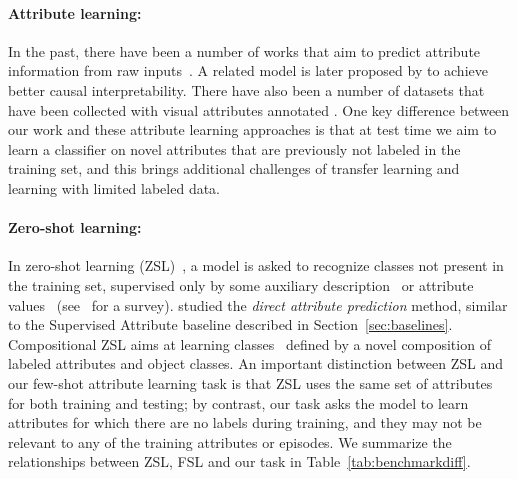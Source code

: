 \paragraph{Attribute learning:}
In the past, there have been a number of works that aim to predict attribute
information from raw
inputs~\citep{ferrari2007attribute,farhadi2009describe,farhadi2010attribute,wang2010discriminative}.
A related model is later proposed by \citet{koh2020concept} to achieve better
causal interpretability.%
There have also been a number of datasets that have been collected with visual
attributes annotated
\citep{cub,zappos,celeba,patterson2016coco,pham2021attribute}. One key
difference between our work and these attribute learning approaches is that at
test time we aim to learn a classifier on novel attributes that are previously
not labeled in the training set, and this brings additional challenges of
transfer learning and learning with limited labeled data.

\savespacebeforesection
\paragraph{Zero-shot learning:} In zero-shot learning
(ZSL)~\citep{farhadi2009describe,labelembed,goodbadugly,attributezsl,ezzsl,evaluateoutput},
a model is asked to recognize classes not present in the training set,
supervised only by some auxiliary description~\citep{descriptionzsl} or
attribute values~\citep{farhadi2009describe} (see~\citet{wang2019survey} for a
survey). \citet{attributezsl} studied the \textit{direct attribute prediction}
method, similar to the Supervised Attribute baseline described in
Section~\ref{sec:baselines}. Compositional ZSL aims at learning
classes~\citep{czsl,taskdriven,taskaware,unseencomposition} defined by a novel
composition of labeled attributes and object classes. An important distinction
between ZSL and our few-shot attribute learning task is that ZSL uses the same
set of attributes for both training and testing; by contrast, our task asks the
model to learn attributes for which there are no labels during training, and
they may not be relevant to any of the training attributes or episodes. We
summarize the relationships between ZSL, FSL and our task in
Table~\ref{tab:benchmarkdiff}.

